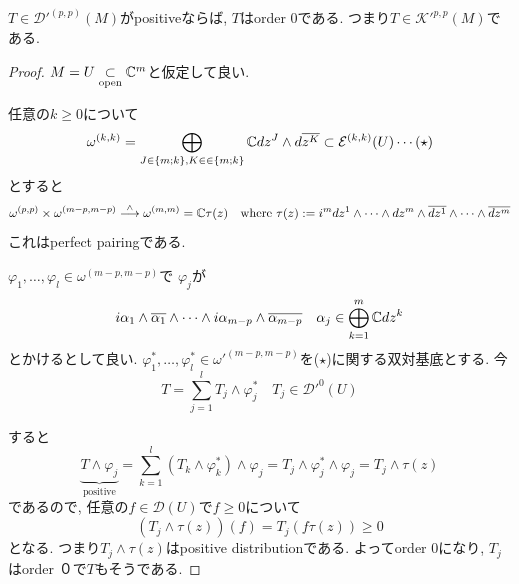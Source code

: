 \begin{tcolorbox}[mybox]
\begin{lem}
\label{lem-M-7.4.10}
$T \in {\mathcal{D}'}^{(p,p)}(M)$がpositiveならば, $T$はorder 0である. 
つまり$T \in {\mathcal{K}'}^{p,p}(M)$である. 
\end{lem}
\end{tcolorbox}
\begin{proof}
$M=U \underset{\text{open}}{\subset} \mathbb{C}^m$と仮定して良い. 

任意の$k \ge 0$について
$$
\omega^{(k,k)}
=
 \bigoplus_{J \in \{m ; k\}, K \in \in \{m; k \}}
\mathbb{C} dz^J \wedge d \overline{z^K}
\subset  {\mathcal{E}}^{(k,k)}(U)
\cdots \text{($\star$)}
$$
とすると
$$
\omega^{(p,p)} 
\times 
\omega^{(m-p,m-p)} 
\overset{\wedge}{\longrightarrow}
\omega^{(m,m)}
=\mathbb{C} \tau(z)
\quad 
\text{where }
\tau(z):= i^{m}dz^1 \wedge \cdots \wedge dz^m \wedge \overline{dz^1} \wedge \cdots \wedge \overline{dz^m}
$$
これはperfect pairingである. 

$\varphi_1, \ldots, \varphi_l \in \omega^{(m-p,m-p)}$で
$\varphi_j$が
$$
i\alpha_1\wedge\overline{\alpha_1}\wedge\cdots\wedge
i\alpha_{m-p}\wedge\overline{\alpha_{m-p}}
\quad 
\alpha_j \in \bigoplus_{k=1}^{m} \mathbb{C} dz^k
$$
とかけるとして良い. 
$\varphi^{*}_1, \ldots, \varphi^{*}_l \in {\omega'}^{(m-p,m-p)}$を($\star$)に関する双対基底とする. 
今
$$
T=\sum_{j=1}^{l} T_j \wedge \varphi^{*}_j
\quad 
T_j \in {\mathcal{D}'}^{0}(U)
$$

すると
$$
\underbrace{T \wedge \varphi_j}_{\text{positive}}
=
\sum_{k=1}^{l}
(T_k \wedge \varphi^{*}_k) \wedge \varphi_j
= T_j \wedge \varphi^{*}_j\wedge \varphi_j
= T_j \wedge \tau (z)
$$
であるので, 任意の$f \in \mathcal{D}(U)$で$f \ge 0$について
$$
(T_j \wedge \tau (z))(f)
= T_j (f \tau(z)) \ge 0
$$
となる. 
つまり$T_j \wedge \tau (z)$はpositive distributionである. 
よってorder 0になり, $T_j$はorder ０で$T$もそうである. 
\end{proof}




